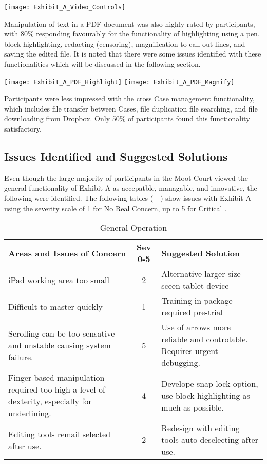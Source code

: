 \texttt{[image: Exhibit\_A\_Video\_Controls]}

Manipulation of text in a PDF document was also highly rated by participants, with 80\% responding favourably for the functionality of highlighting using a pen, block highlighting, redacting (censoring), magnification to call out lines, and saving the edited file. It is noted that there were some issues identified with these functionalities which will be discussed in the following section.

\texttt{[image: Exhibit\_A\_PDF\_Highlight]}
\texttt{[image: Exhibit\_A\_PDF\_Magnify]}

Participants were less impressed with the cross Case management functionality, which includes file transfer between Cases, file duplication file searching, and file downloading from Dropbox. Only 50\% of participants found this functionality satisfactory.

\subsection{Issues Identified and Suggested Solutions}
Even though the large majority of participants in the Moot Court viewed the general functionality of Exhibit A as accepatble, managable, and innovative, the following were identified.
The following tables ( - ) show issues with Exhibit A using the severity scale of 1 for No Real Concern, up to 5 for Critical \citep{Nielsen1990}.

\begin{center}
\begin{table}[htbp]
\label{tab:Issues_General_Operation}
  \centering
  \caption{General Operation}
    \begin{tabular}{|p{}|c|p{}|}
    \hline
    \rowcolor{lightgrey}\multicolumn{3}{|l|}{General Operation} \\
    \hline
    \textbf{Areas and Issues of Concern} & \textbf{Sev 0-5} & \textbf{Suggested Solution}\\
    \hline
    iPad working area too small & 2 & Alternative larger size sceen tablet device\\
    \hline
    Difficult to master quickly & 1 & Training in package required pre-trial\\
    \hline
   Scrolling can be too sensative and unstable causing system failure. & 5 & Use of arrows more reliable and controlable. Requires urgent debugging.\\
   \hline
   Finger based manipulation required too high a level of dexterity, especially for underlining. & 4 & Develope snap lock option, use block highlighting as much as possible.\\
   \hline
   Editing tools remail selected after use. & 2 & Redesign with editing tools auto deselecting after use.\\
   \hline
   
\end{tabular}
\end{table}
\end{center}

